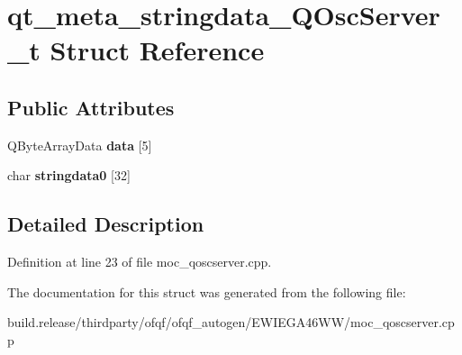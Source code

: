 \hypertarget{structqt__meta__stringdata___q_osc_server__t}{}\section{qt\+\_\+meta\+\_\+stringdata\+\_\+\+Q\+Osc\+Server\+\_\+t Struct Reference}
\label{structqt__meta__stringdata___q_osc_server__t}
\subsection*{Public Attributes}
\begin{DoxyCompactItemize}
\item 
\mbox{\label{structqt__meta__stringdata___q_osc_server__t_a4444277bd9567630e8433e3941ab58a3}} 
Q\+Byte\+Array\+Data {\bfseries data} \mbox{[}5\mbox{]}
\item 
\mbox{\label{structqt__meta__stringdata___q_osc_server__t_afc0ae0f2a604ed211edf5242cd704f99}} 
char {\bfseries stringdata0} \mbox{[}32\mbox{]}
\end{DoxyCompactItemize}


\subsection{Detailed Description}


Definition at line 23 of file moc\+\_\+qoscserver.\+cpp.



The documentation for this struct was generated from the following file\+:\begin{DoxyCompactItemize}
\item 
build.\+release/thirdparty/ofqf/ofqf\+\_\+autogen/\+E\+W\+I\+E\+G\+A46\+W\+W/moc\+\_\+qoscserver.\+cpp\end{DoxyCompactItemize}
